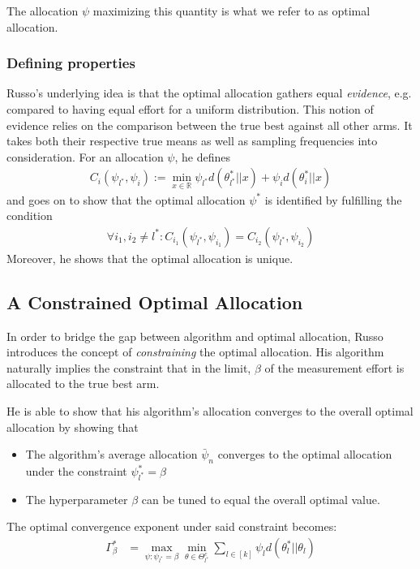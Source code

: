 The allocation $\psi$ maximizing this quantity is what we refer to as optimal allocation.

\subsubsection{Defining properties}
Russo's underlying idea is that the optimal allocation gathers equal \emph{evidence}, e.g. compared to having equal effort for a uniform distribution. This notion of evidence relies on the comparison between the true best against all other arms. It takes both their respective true means as well as sampling frequencies into consideration. For an allocation $\psi$, he defines
\begin{align}
  C_i(\psi_{l^*}, \psi_i) := \min_{x \in \mathbb{R}} \psi_{l^*} d(\theta_{l^*}^*||x) + \psi_i d(\theta_{i}^*||x)
\end{align}
and goes on to show that the optimal allocation $\psi^*$ is identified by fulfilling the condition
\begin{align}
  \forall i_1, i_2 \neq l^*: C_{i_1}(\psi_{l^*}, \psi_{i_1}) = C_{i_2}(\psi_{l^*}, \psi_{i_2})
\end{align}
Moreover, he shows that the optimal allocation is unique.

\subsection{A Constrained Optimal Allocation}

In order to bridge the gap between algorithm and optimal allocation, Russo introduces the concept of \emph{constraining} the optimal allocation. His algorithm naturally implies the constraint that in the limit, $\beta$ of the measurement effort is allocated to the true best arm.

He is able to show that his algorithm's allocation converges to the overall optimal allocation by showing that
\begin{itemize}
  \item The algorithm's average allocation $\bar{\psi}_n$ converges to the optimal allocation under the constraint $\psi_{l^*}^* = \beta$
  \item The hyperparameter $\beta$ can be tuned to equal the overall optimal value.
\end{itemize}
The optimal convergence exponent under said constraint becomes:
\begin{align}
  \Gamma^*_{\beta} &= \max_{\psi: \psi_{l^*} = \beta} \min_{\theta \in \Theta^c_{l^*}} \sum_{l \in [k]} \psi_l d(\theta_l^* || \theta_l)
\end{align}

